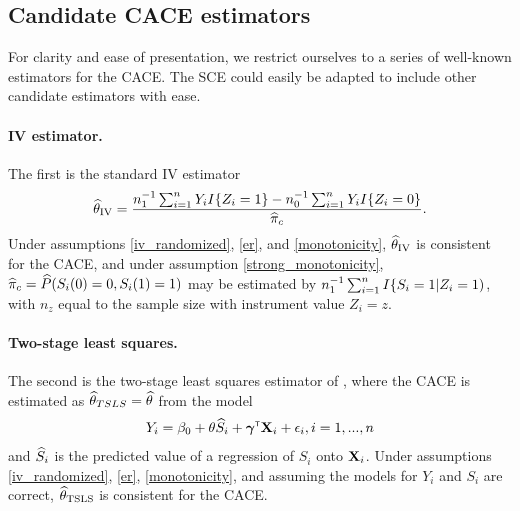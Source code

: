 \documentclass{article}
\def\siv{_{\text{IV}}}
\def\stsls{_{\text{TSLS}}}
\newtheorem{assumption}{Assumption}
\begin{document}




\subsection{Candidate CACE estimators}
For clarity and ease of presentation, we restrict ourselves to a series of well-known estimators for the CACE. The SCE could easily be adapted to include other candidate estimators with ease. 

\paragraph{IV estimator.} The first is the standard IV estimator
\begin{align}
    \thetahat\siv = \frac{n_1\inv\sum_{i=1}^nY_iI\{Z_i = 1\} - n_0\inv\sum_{i=1}^nY_iI\{Z_i = 0\}}{\pihat_c}. \label{iv_est}
\end{align}
Under assumptions \ref{iv_randomized}, \ref{er}, and \ref{monotonicity}, $\thetahat\siv$ is consistent for the CACE, and under assumption \ref{strong_monotonicity}, ${\widehat\pi}_c = {\widehat P}(S_i(0) = 0, S_i(1) = 1)$ may be estimated by $n_1^{-1}\sum_{i=1}^n I\{S_i = 1 | Z_i = 1)$, with $n_z$ equal to the sample size with instrument value $Z_i = z$.

\paragraph{Two-stage least squares.} The second is the two-stage least squares estimator of \cite{Angrist1995}, where the CACE is estimated as ${\widehat\theta}_{TSLS} = {\widehat\theta}$ from the model
\begin{align}
    Y_i = \beta_0 + \theta {\widehat S}_i + \boldsymbol{\gamma}^{{\sf \scriptscriptstyle{T}}}{\bf X}_i + \epsilon_i, i = 1, ..., n
\end{align}
and ${\widehat S}_i$ is the predicted value of a regression of $S_i$ onto ${\bf X}_i$. Under assumptions \ref{iv_randomized}, \ref{er}, \ref{monotonicity}, and assuming the models for $Y_i$ and $S_i$ are correct, $\thetahat\stsls$ is consistent for the CACE.
\end{document}
